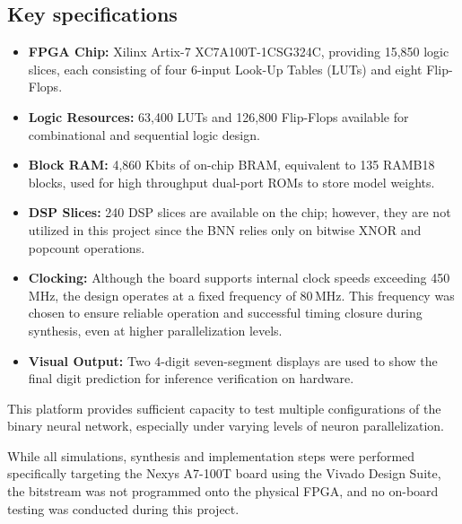 \documentclass[a4paper,12pt]{report}
\begin{document}
\subsection{Key specifications}
\begin{itemize}
    \item \textbf{FPGA Chip:} Xilinx Artix-7 XC7A100T-1CSG324C, providing 15,850 logic slices, each consisting of four 6-input Look-Up Tables (LUTs) and eight Flip-Flops.
    \item \textbf{Logic Resources:} 63,400 LUTs and 126,800 Flip-Flops available for combinational and sequential logic design.
    \item \textbf{Block RAM:} 4,860 Kbits of on-chip BRAM, equivalent to 135 RAMB18 blocks, used for high throughput dual-port ROMs to store model weights.
    \item \textbf{DSP Slices:} 240 DSP slices are available on the chip; however, they are not utilized in this project since the BNN relies only on bitwise XNOR and popcount operations.
    \item \textbf{Clocking:} Although the board supports internal clock speeds exceeding 450\,MHz, the design operates at a fixed frequency of 80\,MHz. This frequency was chosen to ensure reliable operation and successful timing closure during synthesis, even at higher parallelization levels.
    \item \textbf{Visual Output:} Two 4-digit seven-segment displays are used to show the final digit prediction for inference verification on hardware.
\end{itemize}
This platform provides sufficient capacity to test multiple configurations of the binary neural network, especially under varying levels of neuron parallelization.

While all simulations, synthesis and implementation steps were performed specifically targeting the Nexys A7-100T board using the Vivado Design Suite, the bitstream was not programmed onto the physical FPGA, and no on-board testing was conducted during this project.
\end{document}
